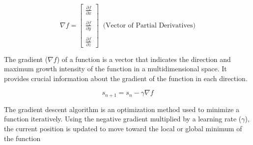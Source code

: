 \begin{minipage}{0.48\textwidth}
	\vspace{0.5cm}
	
	\topic[Gradients]
	
	\[
		\nabla f=\left[\begin{array}{c}
			\frac{\partial f}{\partial x} \\
			\\
			\frac{\partial f}{\partial y} \\
			\\
			\frac{\partial f}{\partial z}
		\end{array}\right] \;\; \text{(Vector of Partial Derivatives)}
	\]
	
	The gradient ($\nabla f$) of a function is a vector that indicates the direction and maximum growth intensity of the function in a multidimensional space. It provides crucial information about the gradient of the function in each direction.
	
	\divider
	
	\[
		s_{n+1}=s_{n}-\gamma \nabla f
	\]
	
	The gradient descent algorithm is an optimization method used to minimize a function iteratively. Using the negative gradient multiplied by a learning rate ($\gamma$), the current position is updated to move toward the local or global minimum of the function
	
\end{minipage}